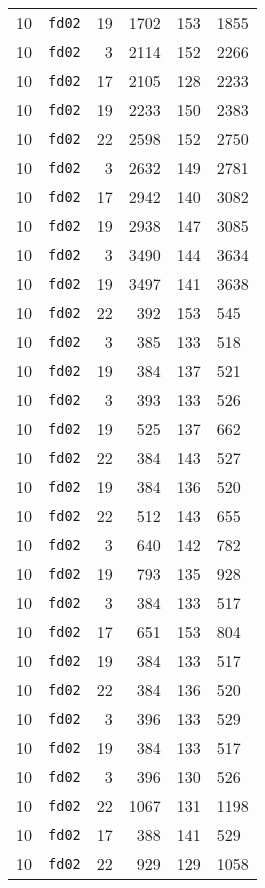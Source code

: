 \documentclass{article}
\begin{document}
\begin{table}[h!]
\begin{tabular}{llrrrl}
    10 & \texttt{fd02} & 19 & 1702 & 153 & 1855 \\
    10 & \texttt{fd02} & 3 & 2114 & 152 & 2266 \\
    10 & \texttt{fd02} & 17 & 2105 & 128 & 2233 \\
    10 & \texttt{fd02} & 19 & 2233 & 150 & 2383 \\
    10 & \texttt{fd02} & 22 & 2598 & 152 & 2750 \\
    10 & \texttt{fd02} & 3 & 2632 & 149 & 2781 \\
    10 & \texttt{fd02} & 17 & 2942 & 140 & 3082 \\
    10 & \texttt{fd02} & 19 & 2938 & 147 & 3085 \\
    10 & \texttt{fd02} & 3 & 3490 & 144 & 3634 \\
    10 & \texttt{fd02} & 19 & 3497 & 141 & 3638 \\
    10 & \texttt{fd02} & 22 & 392 & 153 & 545 \\
    10 & \texttt{fd02} & 3 & 385 & 133 & 518 \\
    10 & \texttt{fd02} & 19 & 384 & 137 & 521 \\
    10 & \texttt{fd02} & 3 & 393 & 133 & 526 \\
    10 & \texttt{fd02} & 19 & 525 & 137 & 662 \\
    10 & \texttt{fd02} & 22 & 384 & 143 & 527 \\
    10 & \texttt{fd02} & 19 & 384 & 136 & 520 \\
    10 & \texttt{fd02} & 22 & 512 & 143 & 655 \\
    10 & \texttt{fd02} & 3 & 640 & 142 & 782 \\
    10 & \texttt{fd02} & 19 & 793 & 135 & 928 \\
    10 & \texttt{fd02} & 3 & 384 & 133 & 517 \\
    10 & \texttt{fd02} & 17 & 651 & 153 & 804 \\
    10 & \texttt{fd02} & 19 & 384 & 133 & 517 \\
    10 & \texttt{fd02} & 22 & 384 & 136 & 520 \\
    10 & \texttt{fd02} & 3 & 396 & 133 & 529 \\
    10 & \texttt{fd02} & 19 & 384 & 133 & 517 \\
    10 & \texttt{fd02} & 3 & 396 & 130 & 526 \\
    10 & \texttt{fd02} & 22 & 1067 & 131 & 1198 \\
    10 & \texttt{fd02} & 17 & 388 & 141 & 529 \\
    10 & \texttt{fd02} & 22 & 929 & 129 & 1058 \\

\end{tabular}
\end{table}
\end{document}
